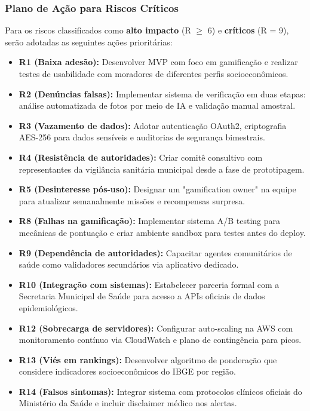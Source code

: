 \documentclass[a4paper, 12pt]{article}
\begin{document}
\newpage
\subsubsection{Plano de Ação para Riscos Críticos}

Para os riscos classificados como \textbf{alto impacto} (R $\geq$ 6) e \textbf{críticos} (R = 9), serão adotadas as seguintes ações prioritárias:

\begin{itemize}
    \item \textbf{R1 (Baixa adesão):} Desenvolver MVP com foco em gamificação e realizar testes de usabilidade com moradores de diferentes perfis socioeconômicos.
    \item \textbf{R2 (Denúncias falsas):} Implementar sistema de verificação em duas etapas: análise automatizada de fotos por meio de IA e validação manual amostral.
    \item \textbf{R3 (Vazamento de dados):} Adotar autenticação OAuth2, criptografia AES-256 para dados sensíveis e auditorias de segurança bimestrais.
    \item \textbf{R4 (Resistência de autoridades):} Criar comitê consultivo com representantes da vigilância sanitária municipal desde a fase de prototipagem.
    \item \textbf{R5 (Desinteresse pós-uso):} Designar um "gamification owner" na equipe para atualizar semanalmente missões e recompensas surpresa.
    \item \textbf{R8 (Falhas na gamificação):} Implementar sistema A/B testing para mecânicas de pontuação e criar ambiente sandbox para testes antes do deploy.
    \item \textbf{R9 (Dependência de autoridades):} Capacitar agentes comunitários de saúde como validadores secundários via aplicativo dedicado.
    \item \textbf{R10 (Integração com sistemas):} Estabelecer parceria formal com a Secretaria Municipal de Saúde para acesso a APIs oficiais de dados epidemiológicos.
    \item \textbf{R12 (Sobrecarga de servidores):} Configurar auto-scaling na AWS com monitoramento contínuo via CloudWatch e plano de contingência para picos.
    \item \textbf{R13 (Viés em rankings):} Desenvolver algoritmo de ponderação que considere indicadores socioeconômicos do IBGE por região.
    \item \textbf{R14 (Falsos sintomas):} Integrar sistema com protocolos clínicos oficiais do Ministério da Saúde e incluir disclaimer médico nos alertas.
\end{itemize}
\end{document}

